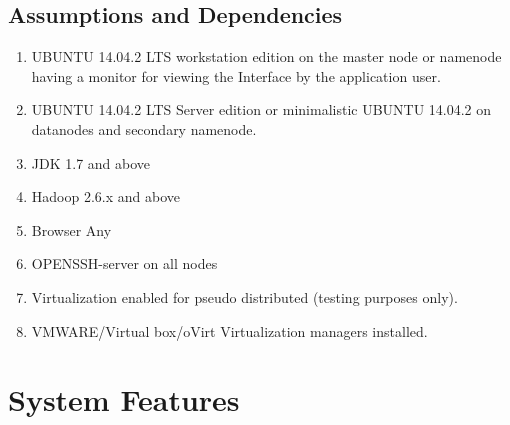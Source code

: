 \documentclass[11pt,letterpaper]{article}
\begin{document}
\subsection{Assumptions and Dependencies}

\begin{enumerate}
\item UBUNTU 14.04.2 LTS workstation edition on the master node or namenode having a monitor for viewing the Interface by the application user.
\item UBUNTU 14.04.2 LTS Server edition or minimalistic UBUNTU 14.04.2 on datanodes and secondary namenode.
\item JDK 1.7 and above
\item Hadoop 2.6.x and above
\item Browser Any
\item OPENSSH-server on all nodes
\item Virtualization enabled for pseudo distributed (testing purposes only).
\item VMWARE/Virtual box/oVirt Virtualization managers installed.
\end{enumerate}


\newpage

\section{System Features}
\end{document}
